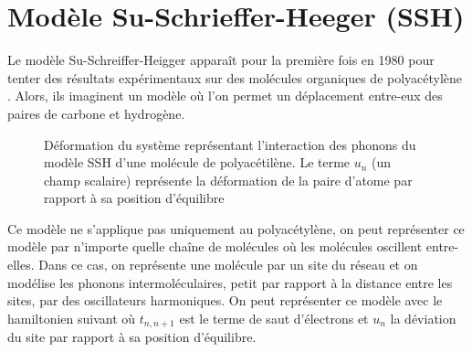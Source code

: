 \section{Modèle Su-Schrieffer-Heeger (SSH)}
Le modèle Su-Schreiffer-Heigger apparaît pour la première fois en 1980 \cite{su_soliton_1980} pour tenter des résultats expérimentaux sur des molécules organiques de polyacétylène \cite{goldberg_electron_1979}. Alors, ils imaginent un modèle où l'on permet un déplacement entre-eux des paires de carbone et hydrogène. 
\begin{figure}[H]
    \centering
    \caption{Déformation du système représentant l'interaction des phonons du modèle SSH d'une molécule de polyacétilène. Le terme $u_n$ (un champ scalaire) représente la déformation de la paire d'atome par rapport à sa position d'équilibre}
\end{figure}
Ce modèle ne s'applique pas uniquement au polyacétylène, on peut représenter ce modèle par n'importe quelle chaîne de molécules où les molécules oscillent entre-elles. Dans ce cas, on représente une molécule par un site du réseau et on modélise les phonons intermoléculaires, petit par rapport à la distance entre les sites, par des oscillateurs harmoniques. On peut représenter ce modèle avec le hamiltonien suivant où $t_{n,n+1}$ est le terme de saut d'électrons et $u_n$ la déviation du site par rapport à sa position d'équilibre.
